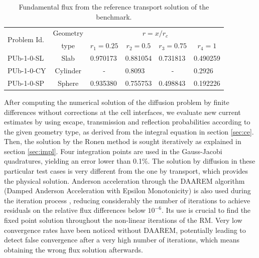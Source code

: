\documentclass{ictt26}
\begin{document}
\begin{table}[hbt]
\centering
\caption{Fundamental flux from the reference transport solution of the benchmark.}\label{tab:rff}
\begin{tabular}{l|c|llll}
\multirow{2}{*}{Problem Id.} & Geometry & \multicolumn{4}{c}{$r=x/r_c$}\\ \cline{3-6}
 & type & \multicolumn{1}{c}{$r_1=0.25$} & \multicolumn{1}{c}{$r_2=0.5$} & \multicolumn{1}{c}{$r_3=0.75$} & \multicolumn{1}{c}{$r_4=1$}\\ \hline
PUb-1-0-SL & Slab     & 0.970173 & 0.881054  & 0.731813 &  0.490259\\
PUb-1-0-CY & Cylinder & \multicolumn{1}{c}{-} & 0.8093     & \multicolumn{1}{c}{-} & 0.2926\\
PUb-1-0-SP & Sphere   & 0.935380 & 0.755753 & 0.498843 & 0.192226
\end{tabular}
\end{table}

After computing the numerical solution of the diffusion problem by finite differences without corrections at the cell interfaces, we evaluate new current estimates by using escape, transmission and reflection probabilities according to the given geometry type, as derived from the integral equation in section \ref{sec:ce}. Then, the solution by the Ronen method is sought iteratively as explained in section \ref{sec:impl}. Four integration points are used in the Gauss-Jacobi quadratures, yielding an error lower than 0.1\%. The solution by diffusion in these particular test cases is very different from the one by transport, which provides the physical solution. Anderson acceleration through the DAAREM algorithm (Damped Anderson Acceleration with Epsilon Monotonicity) is also used during the iteration process \cite{henderson2019damped}, reducing considerably the number of iterations to achieve residuals on the relative flux differences below $10^{-6}$. Its use is crucial to find the fixed point solution throughout the non-linear iterations of the RM. Very low convergence rates have been noticed without DAAREM, potentially leading to detect false convergence after a very high number of iterations, which means obtaining the wrong flux solution afterwards.%
\end{document}
